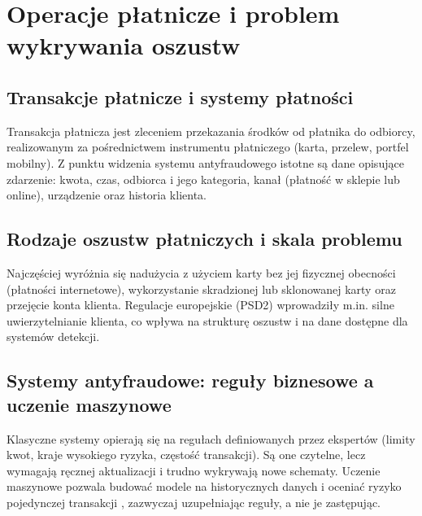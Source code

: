 \chapter{Operacje płatnicze i problem wykrywania oszustw}
\label{ch:platnosci}

\section{Transakcje płatnicze i systemy płatności}
Transakcja płatnicza jest zleceniem przekazania środków od płatnika do odbiorcy, realizowanym za pośrednictwem instrumentu płatniczego (karta, przelew, portfel mobilny). Z punktu widzenia systemu antyfraudowego istotne są dane opisujące zdarzenie: kwota, czas, odbiorca i jego kategoria, kanał (płatność w sklepie lub online), urządzenie oraz historia klienta. 

\section{Rodzaje oszustw płatniczych i skala problemu}
Najczęściej wyróżnia się nadużycia z użyciem karty bez jej fizycznej obecności (płatności internetowe), wykorzystanie skradzionej lub sklonowanej karty oraz przejęcie konta klienta.  Regulacje europejskie (PSD2) wprowadziły m.in. silne uwierzytelnianie klienta, co wpływa na strukturę oszustw i na dane dostępne dla systemów detekcji. 

\section{Systemy antyfraudowe: reguły biznesowe a uczenie maszynowe}
Klasyczne systemy opierają się na regułach definiowanych przez ekspertów (limity kwot, kraje wysokiego ryzyka, częstość transakcji). Są one czytelne, lecz wymagają ręcznej aktualizacji i trudno wykrywają nowe schematy. Uczenie maszynowe pozwala budować modele na historycznych danych i oceniać ryzyko pojedynczej transakcji \cite{dalpozzolo2018}, zazwyczaj uzupełniając reguły, a nie je zastępując.

